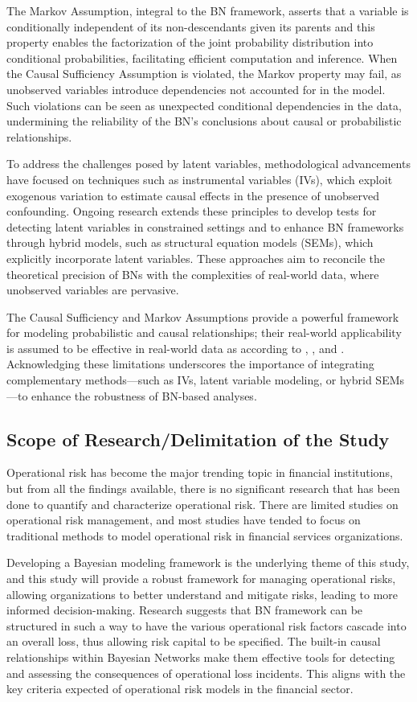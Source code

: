The Markov Assumption, integral to the BN framework, asserts that a variable is conditionally independent of its non-descendants given its parents and this property enables the factorization of the joint probability distribution into conditional probabilities, facilitating efficient computation and inference. When the Causal Sufficiency Assumption is violated, the Markov property may fail, as unobserved variables introduce dependencies not accounted for in the model. Such violations can be seen as unexpected conditional dependencies in the data, undermining the reliability of the BN’s conclusions about causal or probabilistic relationships.

To address the challenges posed by latent variables, methodological advancements have focused on techniques such as instrumental variables (IVs), which exploit exogenous variation to estimate causal effects in the presence of unobserved confounding. Ongoing research extends these principles to develop tests for detecting latent variables in constrained settings and to enhance BN frameworks through hybrid models, such as structural equation models (SEMs), which explicitly incorporate latent variables. These approaches aim to reconcile the theoretical precision of BNs with the complexities of real-world data, where unobserved variables are pervasive.

The Causal Sufficiency and Markov Assumptions provide a powerful framework for modeling probabilistic and causal relationships; their real-world applicability is assumed to be effective in real-world data as according to  \textcite{Fazio2024}, \textcite{Asgari2024}, and \textcite{Miklin2021}. Acknowledging these limitations underscores the importance of integrating complementary methods—such as IVs, latent variable modeling, or hybrid SEMs—to enhance the robustness of BN-based analyses.

\subsection{Scope of Research/Delimitation of the Study}
Operational risk has become the major trending topic in financial institutions, but from all the findings available, there is no significant research that has been done to quantify and characterize operational risk. There are limited studies on operational risk management, and most studies have tended to focus on traditional methods to model operational risk in financial services organizations. 

Developing a Bayesian modeling framework is the underlying theme of this study, and this study will provide a robust framework for managing operational risks, allowing organizations to better understand and mitigate risks, leading to more informed decision-making. Research suggests that BN framework can be structured in such a way to have the various operational risk factors cascade into an overall loss, thus allowing risk capital to be specified. The built-in causal relationships within Bayesian Networks make them effective tools for detecting and assessing the consequences of operational loss incidents. This aligns with the key criteria expected of operational risk models in the financial sector.

